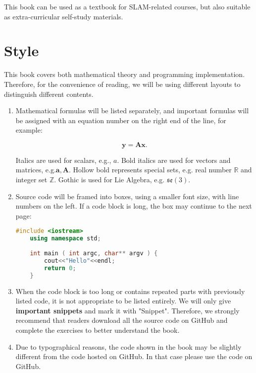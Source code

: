 This book can be used as a textbook for SLAM-related courses, but also suitable as extra-curricular self-study materials.

\section{Style}

This book covers both mathematical theory and programming implementation. Therefore, for the convenience of reading, we will be using different layouts to distinguish different contents.

\begin{enumerate}
	\item Mathematical formulas will be listed separately, and important formulas will be assigned with an equation number on the right end of the line, for example:
	
	\begin{equation}
	\bm{y} =\bm{A}\bm{x}.
	\end{equation}
	
	Italics are used for scalars, e.g., $a$. Bold italics are used for vectors and matrices, e.g.$\bm{a}, \bm{A}$. Hollow bold represents special sets, e.g. real number $\mathbb{R}$ and integer set $\mathbb{Z}$. Gothic is used for Lie Algebra, e.g. $\mathfrak{se}(3)$.
	
	\item Source code will be framed into boxes, using a smaller font size, with line numbers on the left. If a code block is long, the box may continue to the next page:
	\begin{lstlisting}[language=C++]
	#include <iostream>
	using namespace std;
	
	int main ( int argc, char** argv ) {
		cout<<"Hello"<<endl;
		return 0;
	}
	\end{lstlisting}
	
	\item When the code block is too long or contains repeated parts with previously listed code, it is not appropriate to be listed entirely. We will only give \textbf{important snippets} and mark it with "Snippet". Therefore, we strongly recommend that readers download all the source code on GitHub and complete the exercises to better understand the book.
	
	\item Due to typographical reasons, the code shown in the book may be slightly different from the code hosted on GitHub. In that case please use the code on GitHub.
	

\end{enumerate}
